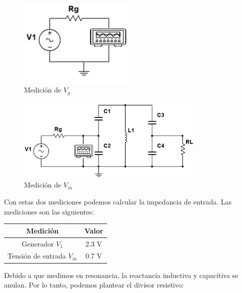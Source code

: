 \begin{figure}[h]
    \centering
    \includegraphics[width=0.5\textwidth]{Imagenes/medicion_zin1.png}
    \caption{Medición de $V_g$}
    \label{fig: de la medición de la impedancia de entrada}
\end{figure}

\newpage

\begin{figure}[h]
    \centering
    \includegraphics[width=0.8\textwidth]{Imagenes/medicion_zin2.png}
    \caption{Medición de $V_{in}$}
    \label{fig: de la medición de la impedancia de entrada 2}
\end{figure}

Con estas dos mediciones podemos calcular la impedancia de entrada. Las mediciones son las siguientes:
\begin{table}[H]
    \centering
    \begin{tabular}{|c|c|}
    \hline
    \rowcolor[HTML]{C0C0C0} 
    \textbf{Medición} & \textbf{Valor} \\ \hline
    Generador $V_1$            & 2.3  V         \\ \hline
    Tensión de entrada $V_{in}$         & 0.7 V         \\ \hline
    \end{tabular}
\end{table}

Debido a que medimos en resonancia, la reactancia inductiva y capacitiva se anulan. Por lo tanto, podemos plantear el divisor resistivo:

